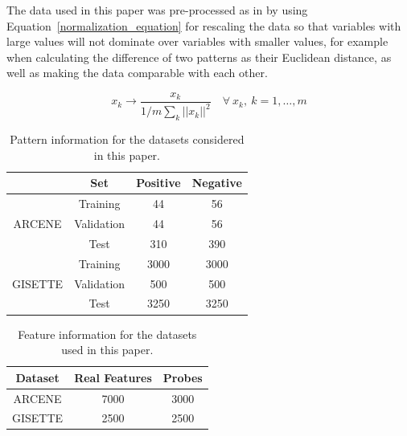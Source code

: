 \documentclass[12pt,a4paper,twocolumn]{article}
\begin{document}
The data used in this paper was pre-processed as in \citep{filter_svms} by using Equation~\ref{normalization_equation} for rescaling the data so that variables with large values will not dominate over variables with smaller values\citep{feature_selection_intro}, for example when calculating the difference of two patterns as their Euclidean distance, as well as making the data comparable with each other\citep{feature_selection_intro}.

\begin{equation}
x_k \to \frac{x_k}{1/m\sum_k||x_k||^2} \quad \forall ~ x_k , ~k= 1,\dots,m
\label{normalization_equation}
\end{equation}

\begin{table}
\center
    \caption{{\footnotesize Pattern information for the datasets considered in this paper.}}
    \label{tab:pattern_info}
    \begin{tabular}{| c | c | c | c |}
	
    \hline
    ~      & Set        & Positive & Negative \\ \hline
    ~      & Training   & 44           & 56           \\ \hline
    ARCENE & Validation & 44           & 56           \\ \hline
    ~      & Test       & 310          & 390          \\ \hline
    ~      & Training          & 3000            & 3000            \\ \hline
    GISETTE      & Validation          & 500            &500            \\ \hline
    ~      & Test          & 3250            & 3250 \\ \hline
    \end{tabular}
\end{table}


\begin{table}
\center
    \caption{{\footnotesize Feature information for the datasets used in this paper.}}
    \label{tab:feature_info}
    \begin{tabular}{| c | c | c |}
 \hline
    Dataset & Real Features & Probes \\ \hline
    ARCENE  & 7000          & 3000   \\ \hline
    GISETTE      & 2500             & 2500      \\ \hline
    \end{tabular}
\end{table}
\end{document}
